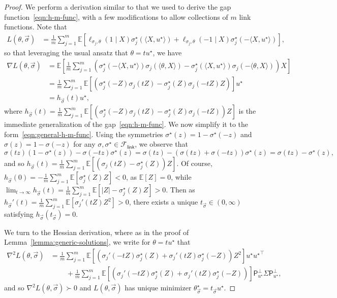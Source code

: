 \documentclass[11pt]{article}
\newcommand{\E}{\mathbb{E}}
\newcommand{\proj}{\mathsf{P}}
\newcommand{\projperp}{\proj_{u\opt}^\perp}
\newcommand{\Flink}{\mathcal{F}_{\mathsf{link}}}
\newcommand{\loss}{\ell}
\newcommand{\<}{\langle} %
\renewcommand{\>}{\rangle}
\newcommand{\opt}{^\star}
\begin{document}
\begin{proof}
	We perform a derivation similar to that we used
	to derive the gap function~\eqref{eqn:h-m-func}, with a few
	modifications to allow collections of $m$ link functions.
	Note that
	\begin{align*}
		L(\theta, \vec{\sigma})
		& = \frac{1}{m} \sum_{j = 1}^m
		\E[\loss_{\sigma_j, \theta}(1 \mid X) \sigma\opt_j(\<X, u\opt\>)
		+ \loss_{\sigma_j,\theta}(-1 \mid X) \sigma\opt_j(-\<X, u\opt\>)],
	\end{align*}
	so that leveraging the usual ansatz that $\theta = t u\opt$, we have
	\begin{align*}
		\nabla L(\theta, \vec{\sigma})
		& = \E\left[\frac{1}{m}
		\sum_{j = 1}^m \left(\sigma\opt_j(-\<X, u\opt\>) \sigma_j(\<\theta, X\>)
		- \sigma\opt_j(\<X, u\opt\>) \sigma_j(-\<\theta, X\>)\right) X \right] \\
		& = \frac{1}{m} \sum_{j = 1}^m
		\E\left[\left(\sigma_j\opt(-Z) \sigma_j(t Z)
		- \sigma_j\opt(Z) \sigma_j(-tZ) Z\right)\right] u\opt \\
		& = h_{\vec{\sigma}}(t) u\opt,
	\end{align*}
	where $h_{\vec{\sigma}}(t) = \frac{1}{m} \sum_{j = 1}^m
	\E[(\sigma_j\opt(-Z) \sigma_j(tZ) - \sigma_j\opt(Z) \sigma_j(-tZ)) Z]$ is
	the immediate generalization of the gap~\eqref{eqn:h-m-func}. We
	now simplify it to the form~\eqref{eqn:general-h-m-func}. Using the
	symmetries $\sigma\opt(z) = 1 - \sigma\opt(-z)$ and $\sigma(z) = 1 -
	\sigma(-z)$ for any $\sigma, \sigma\opt \in \Flink$, we observe that
	\begin{equation*}
		\sigma(tz) (1 - \sigma\opt(z))
		- \sigma(-tz) \sigma\opt(z)
		= \sigma(tz) - (\sigma(tz) + \sigma(-tz)) \sigma\opt(z)
		= \sigma(tz) - \sigma\opt(z),
	\end{equation*}
	and so
	$h_{\vec{\sigma}}(t) = \frac{1}{m} \sum_{j = 1}^m\E[(\sigma_j(tZ) -
	\sigma_j\opt(Z))Z]$.
	Of course, $h_{\vec{\sigma}}(0) = -\frac{1}{m}
	\sum_{j = 1}^m \E[\sigma_j\opt(Z) Z] < 0$, as $\E[Z] = 0$, while
	$\lim_{t \to \infty} h_{\vec{\sigma}}(t) =
	\frac{1}{m} \sum_{j = 1}^m \E[|Z| - \sigma_j\opt(Z) Z] > 0$.
	Then as $h_{\vec{\sigma}}'(t) =
	\frac{1}{m} \sum_{j = 1}^m \E[\sigma_j'(tZ) Z^2] > 0$, there
	exists a unique $t_{\vec{\sigma}} \in (0, \infty)$ satisfying
	$h_{\vec{\sigma}}(t_{\vec{\sigma}}) = 0$.
	
	We turn to the Hessian derivation, where as in the proof of
	Lemma~\ref{lemma:generic-solutions}, we
	write for $\theta = tu\opt$ that
	\begin{align*}
		\nabla^2 L(\theta, \vec{\sigma})
		& = \frac{1}{m} \sum_{j = 1}^m \E\left[
		(\sigma_j'(-t Z) \sigma\opt_j(Z)
		+ \sigma_j'(tZ) \sigma\opt_j(-Z)) Z^2\right] u\opt{u\opt}^\top \\
		& \qquad ~ +
		\frac{1}{m} \sum_{j = 1}^m \E\left[
		(\sigma_j'(-t Z) \sigma\opt_j(Z)
		+ \sigma_j'(tZ) \sigma\opt_j(-Z))\right] \projperp \Sigma
		\projperp,
	\end{align*}
	and so $\nabla^2 L(\theta, \vec{\sigma}) \succ 0$ and $L(\theta,
	\vec{\sigma})$ has unique minimizer $\theta_{\vec{\sigma}}\opt =
	t_{\vec{\sigma}} u\opt$.
\end{proof}
\end{document}
